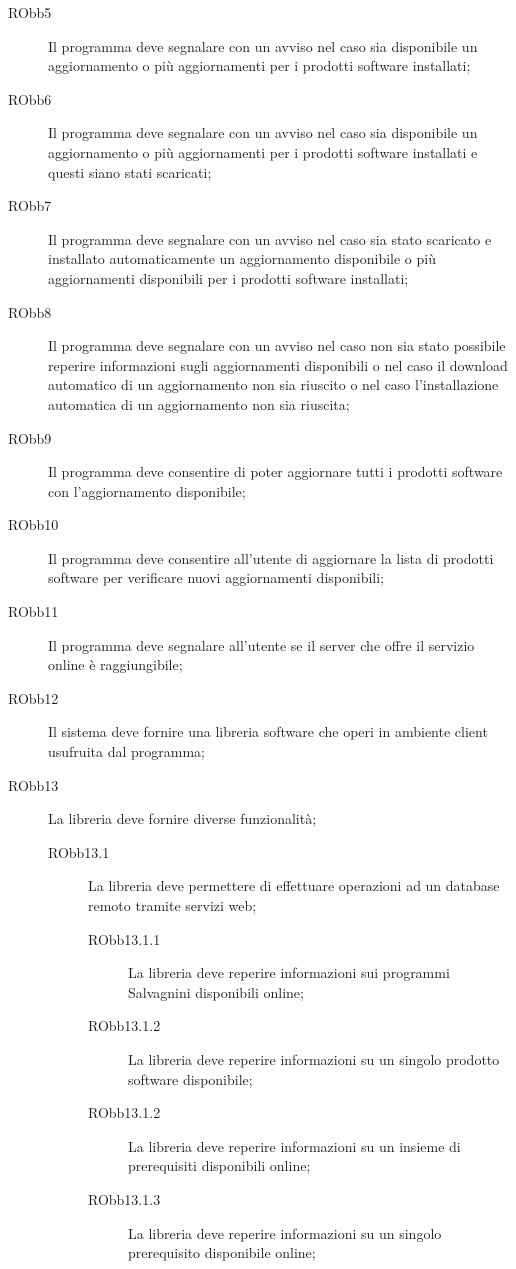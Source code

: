 \documentclass[../RelazioneFinale]{subfiles}
\begin{document}
\begin{description}
				\item[RObb5] Il programma deve segnalare con un avviso nel caso sia disponibile un aggiornamento o più aggiornamenti per i prodotti software installati;
				\item[RObb6] Il programma deve segnalare con un avviso nel caso sia disponibile un aggiornamento o più aggiornamenti per i prodotti software installati e questi siano stati scaricati;
				\item[RObb7] Il programma deve segnalare con un avviso nel caso sia stato scaricato e installato automaticamente un aggiornamento disponibile o più aggiornamenti disponibili per i prodotti software installati;
				\item[RObb8] Il programma deve segnalare con un avviso nel caso non sia stato possibile reperire informazioni sugli aggiornamenti disponibili o nel caso il download automatico di un aggiornamento non sia riuscito	o nel caso l'installazione automatica di un aggiornamento non sia riuscita;
				
				\item[RObb9] Il programma deve consentire di poter aggiornare tutti i prodotti software con l'aggiornamento disponibile;
				\item[RObb10] Il programma deve consentire all'utente di aggiornare la lista di prodotti software per verificare nuovi aggiornamenti disponibili;
				\item[RObb11] Il programma deve segnalare all'utente se il server che offre il servizio online è raggiungibile;
				
				\item[RObb12] Il sistema deve fornire una libreria software che operi in ambiente client usufruita dal programma;
				\item[RObb13] La libreria deve fornire diverse funzionalità;
				
				\begin{description}
					\item[RObb13.1] La libreria deve permettere di effettuare operazioni ad un database remoto tramite servizi web;
					\begin{description}
						\item[RObb13.1.1] La libreria deve reperire informazioni sui programmi Salvagnini disponibili online;
						\item[RObb13.1.2] La libreria deve reperire informazioni su un singolo prodotto software disponibile;
						\item[RObb13.1.2] La libreria deve reperire informazioni su un insieme di prerequisiti disponibili online;
						\item[RObb13.1.3] La libreria deve reperire informazioni su un singolo prerequisito disponibile online;
					\end{description}
					

\end{description}
\end{description}
\end{document}
